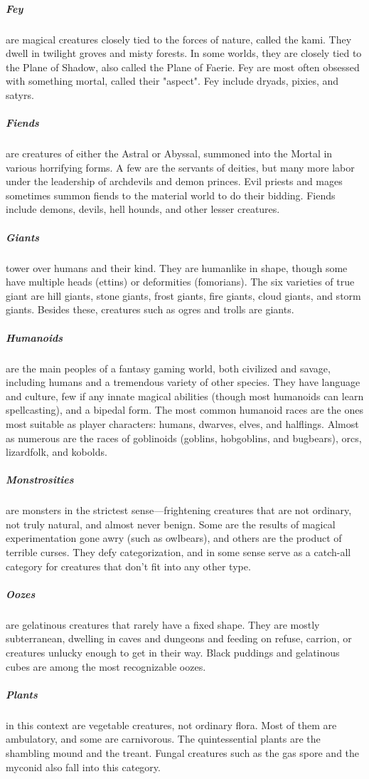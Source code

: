 \subparagraph*{Fey} are magical creatures closely tied to the forces of nature, called the kami. They dwell in twilight groves and misty forests. In some worlds, they are closely tied to the Plane of Shadow, also called the Plane of Faerie. Fey are most often obsessed with something mortal, called their "aspect". Fey include dryads, pixies, and satyrs.

\subparagraph*{Fiends} are creatures of either the Astral or Abyssal, summoned into the Mortal in various horrifying forms. A few are the servants of deities, but many more labor under the leadership of archdevils and demon princes. Evil priests and mages sometimes summon fiends to the material world to do their bidding. Fiends include demons, devils, hell hounds, and other lesser creatures.

\subparagraph*{Giants} tower over humans and their kind. They are humanlike in shape, though some have multiple heads (ettins) or deformities (fomorians). The six varieties of true giant are hill giants, stone giants, frost giants, fire giants, cloud giants, and storm giants. Besides these, creatures such as ogres and trolls are giants.

\subparagraph*{Humanoids} are the main peoples of a fantasy gaming world, both civilized and savage, including humans and a tremendous variety of other species. They have language and culture, few if any innate magical abilities (though most humanoids can learn spellcasting), and a bipedal form. The most common humanoid races are the ones most suitable as player characters: humans, dwarves, elves, and halflings. Almost as numerous are the races of goblinoids (goblins, hobgoblins, and bugbears), orcs, lizardfolk, and kobolds.

\subparagraph*{Monstrosities} are monsters in the strictest sense—frightening creatures that are not ordinary, not truly natural, and almost never benign. Some are the results of magical experimentation gone awry (such as owlbears), and others are the product of terrible curses. They defy categorization, and in some sense serve as a catch-all category for creatures that don't fit into any other type.

\subparagraph*{Oozes} are gelatinous creatures that rarely have a fixed shape. They are mostly subterranean, dwelling in caves and dungeons and feeding on refuse, carrion, or creatures unlucky enough to get in their way. Black puddings and gelatinous cubes are among the most recognizable oozes.

\subparagraph*{Plants} in this context are vegetable creatures, not ordinary flora. Most of them are ambulatory, and some are carnivorous. The quintessential plants are the shambling mound and the treant. Fungal creatures such as the gas spore and the myconid also fall into this category.

